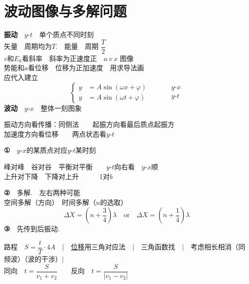 \section{波动图像与多解问题}
\textbf{振动}　$y$-$t$　单个质点不同时刻\\
\hspace*{1em}矢量　周期均为$T$.　能量　周期 $\dfrac{T}{2}$\\
\hspace*{1em}$v$和$E_k$看斜率　斜率为正速度正　$a\ v\ x$ 图像\\
\hspace*{1em}势能和$a$看位移　位移为正加速度　用求导法画\\
\hspace*{1em}应代入建立
\[
\left\{\begin{aligned}
y&=A\sin(\omega x+\varphi)\\
y&=A\sin(\omega t+\varphi)
\end{aligned}\right.
\qquad
\begin{aligned}
&y\text{-}x\\
&y\text{-}t
\end{aligned}
\]
\textbf{波动}　$y$-$x$　整体一刻图象

\hspace*{1em}振动方向看传播：同侧法　　起振方向看最后质点起振方\\
\hspace*{1em}加速度方向看位移　　两点状态看$y$-$t$

\medskip
\textbf{①}　$y$-$x$的某质点对应$y$-$t$某时刻

峰对峰　谷对谷　平衡对平衡　　$y$-$t$向右看　$y$-$x$顺\\
上升对下降　下降对上升　　　1对$b$

\textbf{②}　多解.　左右两种可能\\
空间多解（方向）　时间多解（$n$的选取）
\[
\Delta X=\left(n+\dfrac{3}{4}\right)\lambda\quad\text{or}\quad \Delta X=\left(n+\dfrac{1}{4}\right)\lambda
\]
\textbf{③}　先传到后振动.

路程　$S=\dfrac{t}{T}\cdot 4A$　$\big|$　\underline{位移}用三角对应法　$\big|$　三角函数找　$\big|$　考虑相长相消（同频波）（波的干涉）$\big|$\\[0.8ex]
同向　$t=\dfrac{S}{v_1+v_2}$　　反向　$t=\dfrac{S}{|v_1-v_2|}$ %

